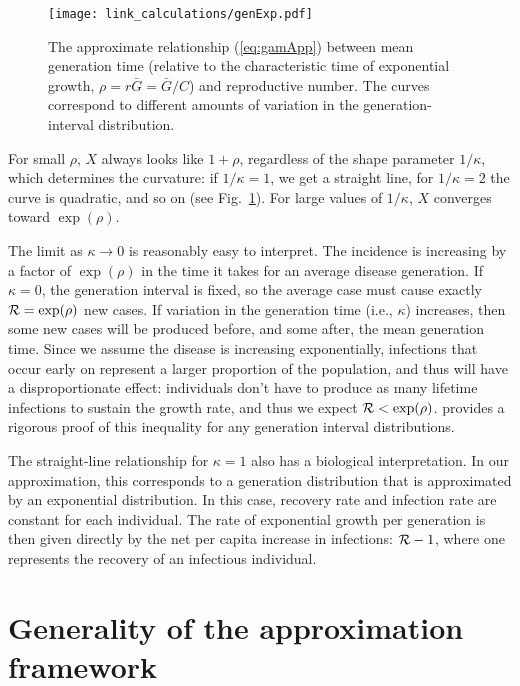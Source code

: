 \documentclass[12pt]{article}
\newcommand{\RR}{\ensuremath{{\cal R}}}
\newcommand{\Tc}{\ensuremath{C}}
\newcommand{\eref}[1]{(\ref{eq:#1})}
\newcommand{\fref}[1]{Fig.~\ref{fig:#1}}
\begin{document}
\begin{figure}[htbp]
	\centering \texttt{[image: link\_calculations/genExp.pdf]}
	\caption{
		The approximate relationship \eref{gamApp} between mean
		generation time (relative to the characteristic time of
		exponential growth, $\rho = r \bar G = \bar G/\Tc$)
		and reproductive number.
		The curves correspond to different
		amounts of variation in the generation-interval
		distribution. 
	} \label{fig:genExp} 
\end{figure}

For small $\rho$, $X$ always looks like $1+\rho$, regardless of the shape parameter $1/\kappa$, which determines the curvature: if $1/\kappa = 1$, we get a straight line, for $1/\kappa=2$ the curve is quadratic, and so on (see \fref{genExp}).
For large values of $1/\kappa$, $X$ converges toward $\exp(\rho)$.

The limit as $\kappa\to 0$ is reasonably easy to interpret. The incidence is increasing by a factor of $\exp(\rho)$ in the time it takes for an average disease generation. If $\kappa=0$, the generation interval is fixed, so the average case must cause exactly $\RR = \exp(\rho)$ new cases.
If variation in the generation time (i.e., $\kappa$) increases, then some new cases will be produced before, and some after, the mean generation time.
Since we assume the disease is increasing exponentially, infections that occur early on represent a larger proportion of the population, and thus will have a disproportionate effect: individuals don't have to produce as many lifetime infections to sustain the growth rate, and thus we expect  $\RR < \exp(\rho)$.
\cite{WallLips07} provides a rigorous proof of this inequality for any generation interval distributions.

The straight-line relationship for $\kappa=1$ also has a biological interpretation. 
In our approximation, this corresponds to a generation distribution that is approximated by an exponential distribution. 
In this case, recovery rate and infection rate are constant for each individual.
The rate of exponential growth per generation is then given directly by the net per capita increase in infections: $\RR-1$, where one represents the recovery of an infectious individual. 

\section{Generality of the approximation framework}
\label{generality}
\end{document}
